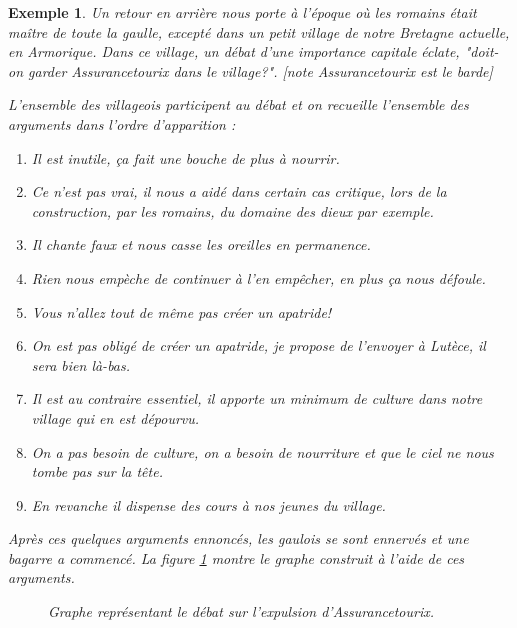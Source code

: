 \documentclass[11pt]{article}
\theoremstyle{defi}
\theoremstyle{not}
\theoremstyle{prob}
\newtheorem{exemple}{Exemple}[section]
\begin{document}
    \begin{exemple}
      Un retour en arrière nous porte à l'époque où les romains était maître de toute la gaulle, excepté dans un petit village de notre Bretagne actuelle, en Armorique.
      Dans ce village, un débat d'une importance capitale éclate, "doit-on garder Assurancetourix dans le village?". [note Assurancetourix est le barde]

      L'ensemble des villageois participent au débat et on recueille l'ensemble des arguments dans l'ordre d'apparition :
      \begin{enumerate}[label=$a_\arabic*$.]
        \item Il est inutile, ça fait une bouche de plus à nourrir.
        \item Ce n'est pas vrai, il nous a aidé dans certain cas critique, lors de la construction, par les romains, du domaine des dieux par exemple.
        \item Il chante faux et nous casse les oreilles en permanence.
        \item Rien nous empèche de continuer à l'en empêcher, en plus ça nous défoule.
        \item Vous n'allez tout de même pas créer un apatride!
        \item On est pas obligé de créer un apatride, je propose de l'envoyer à Lutèce, il sera bien là-bas.
        \item Il est au contraire essentiel, il apporte un minimum de culture dans notre village qui en est dépourvu.
        \item On a pas besoin de culture, on a besoin de nourriture et que le ciel ne nous tombe pas sur la tête.
        \item En revanche il dispense des cours à nos jeunes du village.
      \end{enumerate}
      Après ces quelques arguments ennoncés, les gaulois se sont ennervés et une bagarre a commencé. La figure \ref{fig:asterix} montre le graphe construit à l'aide de ces arguments.

      \begin{figure}
      \centering
      \caption{Graphe représentant le débat sur l'expulsion d'Assurancetourix.}
      \label{fig:asterix}
      \end{figure}


\end{exemple}
\end{document}
